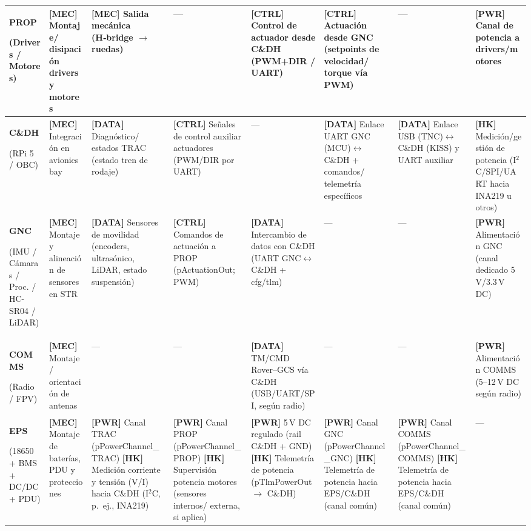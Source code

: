 \begin{landscape}
\begin{longtable}{|p{2.3cm}||p{2.9cm}|p{2.9cm}|p{2.9cm}|p{2.9cm}|p{2.9cm}|p{2.9cm}|p{2.9cm}|}
\textbf{PROP}\par(Drivers / Motores) & \textbf{[MEC]} Montaje/ disipación drivers y motores & \textbf{[MEC]} Salida mecánica (H‑bridge $\rightarrow$ ruedas) & --- & \textbf{[CTRL]} Control de actuador desde C\&DH (PWM+DIR / UART) & \textbf{[CTRL]} Actuación desde GNC (setpoints de velocidad/ torque vía PWM) & --- & \textbf{[PWR]} Canal de potencia a drivers/motores \\ \hline

\textbf{C\&DH}\par(RPi 5 / OBC) & \textbf{[MEC]} Integración en avionics bay & \textbf{[DATA]} Diagnóstico/ estados TRAC (estado tren de rodaje) & \textbf{[CTRL]} Señales de control auxiliar actuadores (PWM/DIR por UART) & --- & \textbf{[DATA]} Enlace UART GNC (MCU)$\leftrightarrow$C\&DH + comandos/ telemetría específicos & \textbf{[DATA]} Enlace USB (TNC)$\leftrightarrow$C\&DH (KISS) y UART auxiliar & \textbf{[HK]} Medición/gestión de potencia (I$^2$C/SPI/UART hacia INA219 u otros) \\ \hline

\textbf{GNC}\par(IMU / Cámaras / Proc. / HC-SR04 / LiDAR) & \textbf{[MEC]} Montaje y alineación de sensores en STR & \textbf{[DATA]} Sensores de movilidad (encoders, ultrasónico, LiDAR, estado suspensión) & \textbf{[CTRL]} Comandos de actuación a PROP (pActuationOut; PWM) & \textbf{[DATA]} Intercambio de datos con C\&DH (UART GNC$\leftrightarrow$C\&DH + cfg/tlm) & --- & --- & \textbf{[PWR]} Alimentación GNC (canal dedicado 5\,V/3.3\,V DC) \\ \hline

\textbf{COMMS}\par(Radio / FPV) & \textbf{[MEC]} Montaje / orientación de antenas & --- & --- & \textbf{[DATA]} TM/CMD Rover--GCS vía C\&DH (USB/UART/SPI, según radio) & --- & --- & \textbf{[PWR]} Alimentación COMMS (5--12\,V DC según radio) \\ \hline

\textbf{EPS}\par(18650 + BMS + DC/DC + PDU) & \textbf{[MEC]} Montaje de baterías, PDU y protecciones & \textbf{[PWR]} Canal TRAC (pPowerChannel\_TRAC) \newline \textbf{[HK]} Medición corriente y tensión (V/I) hacia C\&DH (I$^2$C, p.\ ej., INA219) & \textbf{[PWR]} Canal PROP (pPowerChannel\_PROP) \newline \textbf{[HK]} Supervisión potencia motores (sensores internos/ externa, si aplica) & \textbf{[PWR]} 5\,V DC regulado (rail C\&DH + GND) \newline \textbf{[HK]} Telemetría de potencia (pTlmPowerOut $\rightarrow$ C\&DH) & \textbf{[PWR]} Canal GNC (pPowerChannel\_GNC) \newline \textbf{[HK]} Telemetría de potencia hacia EPS/C\&DH (canal común) & \textbf{[PWR]} Canal COMMS (pPowerChannel\_COMMS) \newline \textbf{[HK]} Telemetría de potencia hacia EPS/C\&DH (canal común) & --- \\ \hline


\end{longtable}
\end{landscape}
